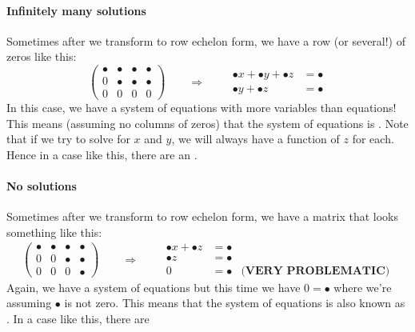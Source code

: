 \documentclass{ximera}
\begin{document}
\paragraph{Infinitely many solutions}

Sometimes after we transform to row echelon form, we have a row (or
several!) of zeros like this:
\[
  \left(
    \begin{array}{ccc|c}
      \bullet &   \bullet & \bullet & \bullet  \\
      0 &   \bullet & \bullet & \bullet \\
      0& 0  & 0 & 0
    \end{array}
  \right)
  \qquad\Longrightarrow\qquad
  \begin{aligned}
    \bullet x +  \bullet y + \bullet z &= \bullet \\
    \bullet y + \bullet z&= \bullet
  \end{aligned}
\]
In this case, we have a system of equations with more variables than
equations! This means (assuming no columns of zeros) that the system
of equations is . Note that if we try to solve
for $x$ and $y$, we will always have a function of $z$ for each. Hence
in a case like this, there are an .



\paragraph{No solutions}

Sometimes after we transform to row echelon form, we have a matrix
that looks something like this:
\[
  \left(
    \begin{array}{ccc|c}
      \bullet &   \bullet & \bullet & \bullet  \\
      0 &   0 & \bullet & \bullet \\
      0& 0  &  0 & \bullet
    \end{array}
  \right)
  \qquad\Longrightarrow\qquad
  \begin{aligned}
    \bullet x  + \bullet z &= \bullet & \\
    \bullet z&= \bullet & \\
    0 &=\bullet & \textbf{(VERY PROBLEMATIC)}
  \end{aligned}
\]
Again, we have a system of equations but this time we have $0 =
\bullet$ where we're assuming $\bullet$ is not zero.  This means that
the system of equations is  also known as
. In a case like this, there are 
\end{document}
